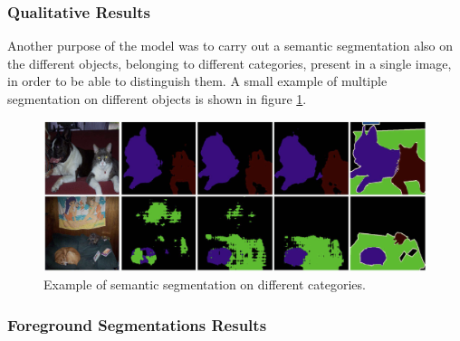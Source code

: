 \subsubsection{Qualitative Results}
Another purpose of the model was to carry out a semantic segmentation also on the different objects, belonging to different categories, present in a single image, in order to be able to distinguish them. A small example of multiple segmentation on different objects is shown in figure \ref{fig:segmentationCategories}.
\begin{figure}[h!]
    \centering
    \includegraphics[width = 1 \linewidth]{images/paper6/multiple segmentation.png}
    \centering
    \caption{Example of semantic segmentation on different categories.}
    \label{fig:segmentationCategories}
\end{figure}

\subsubsection{Foreground Segmentations Results}
